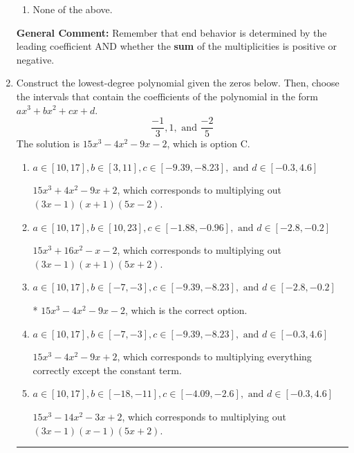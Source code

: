 \documentclass{extbook}[14pt]
\newcommand{\litem}[1]{\item #1

\rule{\textwidth}{0.4pt}}
\begin{document}
\begin{enumerate}
{\begin{enumerate}[label=\Alph*.]
\item None of the above.\end{enumerate}
\textbf{General Comment:} Remember that end behavior is determined by the leading coefficient AND whether the \textbf{sum} of the multiplicities is positive or negative.
}
\litem{
Construct the lowest-degree polynomial given the zeros below. Then, choose the intervals that contain the coefficients of the polynomial in the form $ax^3+bx^2+cx+d$.
\[ \frac{-1}{3}, 1, \text{ and } \frac{-2}{5} \]The solution is \( 15x^{3} -4 x^{2} -9 x -2 \), which is option C.\begin{enumerate}[label=\Alph*.]
\item \( a \in [10, 17], b \in [3, 11], c \in [-9.39, -8.23], \text{ and } d \in [-0.3, 4.6] \)

$15x^{3} +4 x^{2} -9 x + 2$, which corresponds to multiplying out $(3x -1)(x + 1)(5x -2)$.
\item \( a \in [10, 17], b \in [10, 23], c \in [-1.88, -0.96], \text{ and } d \in [-2.8, -0.2] \)

$15x^{3} +16 x^{2} -x -2$, which corresponds to multiplying out $(3x -1)(x + 1)(5x + 2)$.
\item \( a \in [10, 17], b \in [-7, -3], c \in [-9.39, -8.23], \text{ and } d \in [-2.8, -0.2] \)

* $15x^{3} -4 x^{2} -9 x -2$, which is the correct option.
\item \( a \in [10, 17], b \in [-7, -3], c \in [-9.39, -8.23], \text{ and } d \in [-0.3, 4.6] \)

$15x^{3} -4 x^{2} -9 x + 2$, which corresponds to multiplying everything correctly except the constant term.
\item \( a \in [10, 17], b \in [-18, -11], c \in [-4.09, -2.6], \text{ and } d \in [-0.3, 4.6] \)

$15x^{3} -14 x^{2} -3 x + 2$, which corresponds to multiplying out $(3x -1)(x -1)(5x + 2)$.
\end{enumerate}

}
\end{enumerate}
\end{document}
